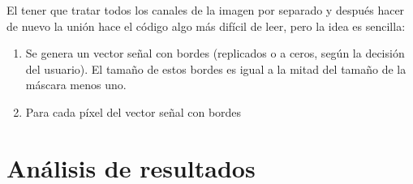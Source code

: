 \documentclass[a4paper, 11pt]{article}
\theoremstyle{definition}
\theoremstyle{theorem}
\begin{document}
  El tener que tratar todos los canales de la imagen por separado y después hacer de nuevo la unión hace el código algo más difícil de leer, pero la idea es sencilla:
  \begin{enumerate}
      \item Se genera un vector señal con bordes (replicados o a ceros, según la decisión del usuario). El tamaño de estos bordes es igual a la mitad del tamaño de la máscara menos uno.
      \item Para cada píxel del vector señal con bordes
  \end{enumerate}

  \section{Análisis de resultados}
\end{document}

